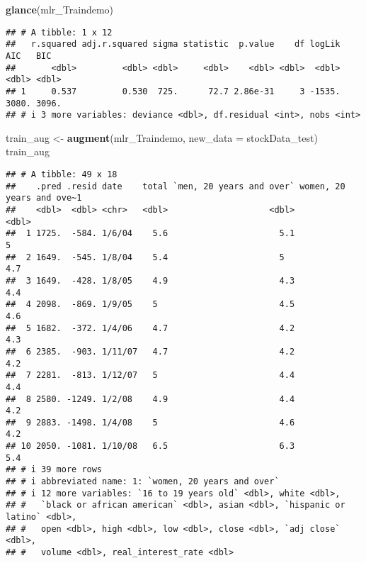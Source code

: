 \documentclass[
]{article}
\newenvironment{Shaded}{\begin{snugshade}}{\end{snugshade}}
\newcommand{\AttributeTok}[1]{\textcolor[rgb]{0.13,0.29,0.53}{#1}}
\newcommand{\FunctionTok}[1]{\textcolor[rgb]{0.13,0.29,0.53}{\textbf{#1}}}
\newcommand{\NormalTok}[1]{#1}
\newcommand{\OtherTok}[1]{\textcolor[rgb]{0.56,0.35,0.01}{#1}}
\begin{document}
\begin{Shaded}
\begin{Highlighting}[]
\FunctionTok{glance}\NormalTok{(mlr\_Traindemo)}
\end{Highlighting}
\end{Shaded}

\begin{verbatim}
## # A tibble: 1 x 12
##   r.squared adj.r.squared sigma statistic  p.value    df logLik   AIC   BIC
##       <dbl>         <dbl> <dbl>     <dbl>    <dbl> <dbl>  <dbl> <dbl> <dbl>
## 1     0.537         0.530  725.      72.7 2.86e-31     3 -1535. 3080. 3096.
## # i 3 more variables: deviance <dbl>, df.residual <int>, nobs <int>
\end{verbatim}

\begin{Shaded}
\begin{Highlighting}[]
\NormalTok{train\_aug }\OtherTok{\textless{}{-}} \FunctionTok{augment}\NormalTok{(mlr\_Traindemo, }\AttributeTok{new\_data =}\NormalTok{ stockData\_test)}
\NormalTok{train\_aug}
\end{Highlighting}
\end{Shaded}

\begin{verbatim}
## # A tibble: 49 x 18
##    .pred .resid date    total `men, 20 years and over` women, 20 years and ove~1
##    <dbl>  <dbl> <chr>   <dbl>                    <dbl>                     <dbl>
##  1 1725.  -584. 1/6/04    5.6                      5.1                       5  
##  2 1649.  -545. 1/8/04    5.4                      5                         4.7
##  3 1649.  -428. 1/8/05    4.9                      4.3                       4.4
##  4 2098.  -869. 1/9/05    5                        4.5                       4.6
##  5 1682.  -372. 1/4/06    4.7                      4.2                       4.3
##  6 2385.  -903. 1/11/07   4.7                      4.2                       4.2
##  7 2281.  -813. 1/12/07   5                        4.4                       4.4
##  8 2580. -1249. 1/2/08    4.9                      4.4                       4.2
##  9 2883. -1498. 1/4/08    5                        4.6                       4.2
## 10 2050. -1081. 1/10/08   6.5                      6.3                       5.4
## # i 39 more rows
## # i abbreviated name: 1: `women, 20 years and over`
## # i 12 more variables: `16 to 19 years old` <dbl>, white <dbl>,
## #   `black or african american` <dbl>, asian <dbl>, `hispanic or latino` <dbl>,
## #   open <dbl>, high <dbl>, low <dbl>, close <dbl>, `adj close` <dbl>,
## #   volume <dbl>, real_interest_rate <dbl>
\end{verbatim}
\end{document}
